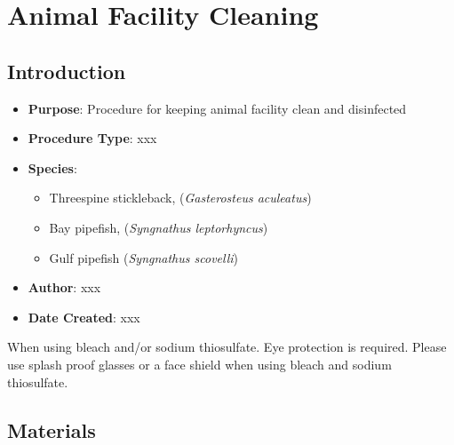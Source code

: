 \documentclass[
  letterpaper,
  DIV=11,
  numbers=noendperiod]{scrreprt}
\providecommand{\tightlist}{%
  \setlength{\itemsep}{0pt}\setlength{\parskip}{0pt}}\usepackage{longtable,booktabs,array}
\begin{document}
\hypertarget{sec-husbandry_facility_cleaning}{%
\chapter{Animal Facility
Cleaning}\label{sec-husbandry_facility_cleaning}}

\hypertarget{introduction-44}{%
\section{Introduction}\label{introduction-44}}

\begin{itemize}
\tightlist
\item
  \textbf{Purpose}: Procedure for keeping animal facility clean and
  disinfected
\item
  \textbf{Procedure Type}: xxx
\item
  \textbf{Species}:

  \begin{itemize}
  \tightlist
  \item
    Threespine stickleback, (\emph{Gasterosteus aculeatus})
  \item
    Bay pipefish, (\emph{Syngnathus leptorhyncus})
  \item
    Gulf pipefish (\emph{Syngnathus scovelli})
  \end{itemize}
\item
  \textbf{Author}: xxx
\item
  \textbf{Date Created}: xxx
\end{itemize}

\begin{tcolorbox}[enhanced jigsaw, rightrule=.15mm, title=\textcolor{quarto-callout-caution-color}{\faFire}\hspace{0.5em}{Chemical Hygiene}, titlerule=0mm, opacitybacktitle=0.6, toprule=.15mm, bottomrule=.15mm, opacityback=0, left=2mm, colframe=quarto-callout-caution-color-frame, breakable, coltitle=black, colback=white, colbacktitle=quarto-callout-caution-color!10!white, bottomtitle=1mm, leftrule=.75mm, toptitle=1mm, arc=.35mm]

When using bleach and/or sodium thiosulfate. Eye protection is required.
Please use splash proof glasses or a face shield when using bleach and
sodium thiosulfate.

\end{tcolorbox}

\hypertarget{materials-42}{%
\section{Materials}\label{materials-42}}
\end{document}
